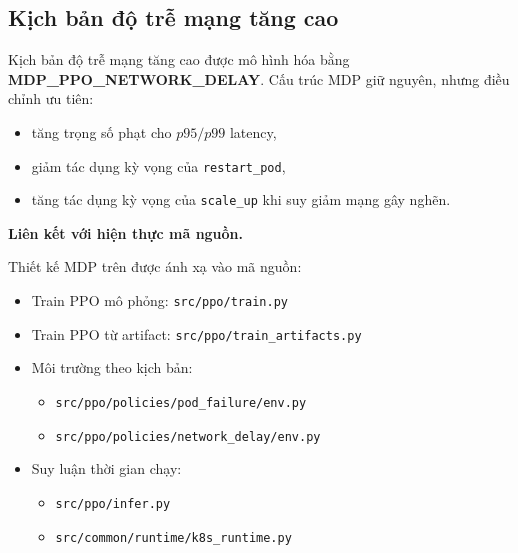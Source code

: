 \subsection{Kịch bản độ trễ mạng tăng cao}

\noindent Kịch bản độ trễ mạng tăng cao được mô hình hóa bằng \textbf{MDP\_PPO\_NETWORK\_DELAY}. Cấu trúc MDP giữ nguyên, nhưng điều chỉnh ưu tiên:
\begin{itemize}
    \item tăng trọng số phạt cho $p95/p99$ latency,
    \item giảm tác dụng kỳ vọng của \texttt{restart\_pod},
    \item tăng tác dụng kỳ vọng của \texttt{scale\_up} khi suy giảm mạng gây nghẽn.
\end{itemize}

\noindent\textbf{Liên kết với hiện thực mã nguồn.}

\noindent Thiết kế MDP trên được ánh xạ vào mã nguồn:
\begin{itemize}
    \item Train PPO mô phỏng: \texttt{src/ppo/train.py}
    \item Train PPO từ artifact: \texttt{src/ppo/train\_artifacts.py}
    \item Môi trường theo kịch bản:
    \begin{itemize}
        \item \texttt{src/ppo/policies/pod\_failure/env.py}
        \item \texttt{src/ppo/policies/network\_delay/env.py}
    \end{itemize}
    \item Suy luận thời gian chạy:
    \begin{itemize}
        \item \texttt{src/ppo/infer.py}
        \item \texttt{src/common/runtime/k8s\_runtime.py}
    \end{itemize}
\end{itemize}
